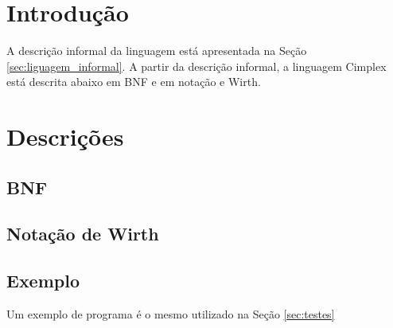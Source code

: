 \label{Cap:Sintático}

\section{Introdução}
A descrição informal da linguagem está apresentada na Seção \ref{sec:liguagem_informal}. A partir da descrição informal, a linguagem Cimplex está descrita abaixo em BNF e em notação e Wirth.

\section{Descrições}
\subsection{BNF}



\subsection{Notação de Wirth}



\subsection{Exemplo}
Um exemplo de programa é o mesmo utilizado na Seção \ref{sec:testes}